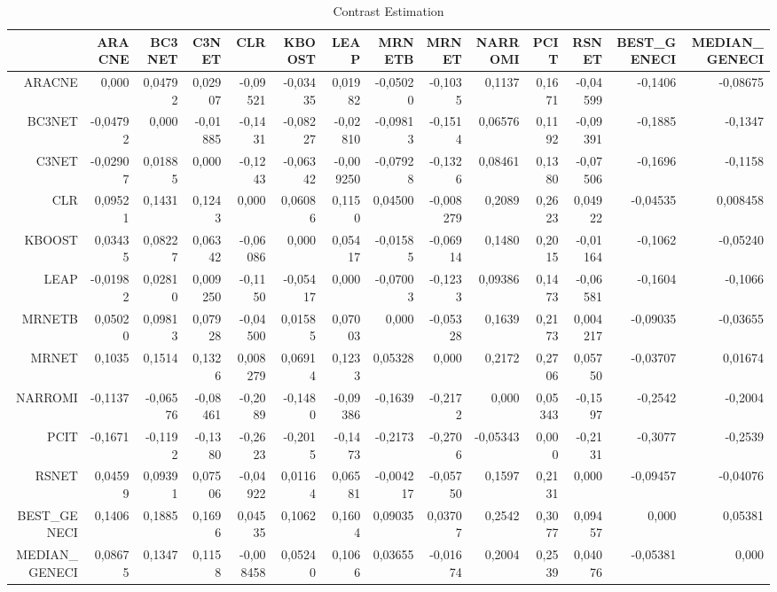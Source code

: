 \documentclass[a4paper,10pt]{article}
\begin{document}
\begin{landscape}
\begin{table}[!htp]
\centering\tiny
\caption{Contrast Estimation}
\begin{tabular}{
|r|r|r|r|r|r|r|r|r|r|r|r|r|r|}
\hline
 &ARACNE&BC3NET&C3NET&CLR&KBOOST&LEAP&MRNETB&MRNET&NARROMI&PCIT&RSNET&BEST_GENECI&MEDIAN_GENECI\\
\hline
ARACNE&0,000&0,04792&0,02907&-0,09521&-0,03435&0,01982&-0,05020&-0,1035&0,1137&0,1671&-0,04599&-0,1406&-0,08675\\
\hline
BC3NET&-0,04792&0,000&-0,01885&-0,1431&-0,08227&-0,02810&-0,09813&-0,1514&0,06576&0,1192&-0,09391&-0,1885&-0,1347\\
\hline
C3NET&-0,02907&0,01885&0,000&-0,1243&-0,06342&-0,009250&-0,07928&-0,1326&0,08461&0,1380&-0,07506&-0,1696&-0,1158\\
\hline
CLR&0,09521&0,1431&0,1243&0,000&0,06086&0,1150&0,04500&-0,008279&0,2089&0,2623&0,04922&-0,04535&0,008458\\
\hline
KBOOST&0,03435&0,08227&0,06342&-0,06086&0,000&0,05417&-0,01585&-0,06914&0,1480&0,2015&-0,01164&-0,1062&-0,05240\\
\hline
LEAP&-0,01982&0,02810&0,009250&-0,1150&-0,05417&0,000&-0,07003&-0,1233&0,09386&0,1473&-0,06581&-0,1604&-0,1066\\
\hline
MRNETB&0,05020&0,09813&0,07928&-0,04500&0,01585&0,07003&0,000&-0,05328&0,1639&0,2173&0,004217&-0,09035&-0,03655\\
\hline
MRNET&0,1035&0,1514&0,1326&0,008279&0,06914&0,1233&0,05328&0,000&0,2172&0,2706&0,05750&-0,03707&0,01674\\
\hline
NARROMI&-0,1137&-0,06576&-0,08461&-0,2089&-0,1480&-0,09386&-0,1639&-0,2172&0,000&0,05343&-0,1597&-0,2542&-0,2004\\
\hline
PCIT&-0,1671&-0,1192&-0,1380&-0,2623&-0,2015&-0,1473&-0,2173&-0,2706&-0,05343&0,000&-0,2131&-0,3077&-0,2539\\
\hline
RSNET&0,04599&0,09391&0,07506&-0,04922&0,01164&0,06581&-0,004217&-0,05750&0,1597&0,2131&0,000&-0,09457&-0,04076\\
\hline
BEST_GENECI&0,1406&0,1885&0,1696&0,04535&0,1062&0,1604&0,09035&0,03707&0,2542&0,3077&0,09457&0,000&0,05381\\
\hline
MEDIAN_GENECI&0,08675&0,1347&0,1158&-0,008458&0,05240&0,1066&0,03655&-0,01674&0,2004&0,2539&0,04076&-0,05381&0,000\\
\hline

\end{tabular}
\end{table}


\end{landscape}
\end{document}
